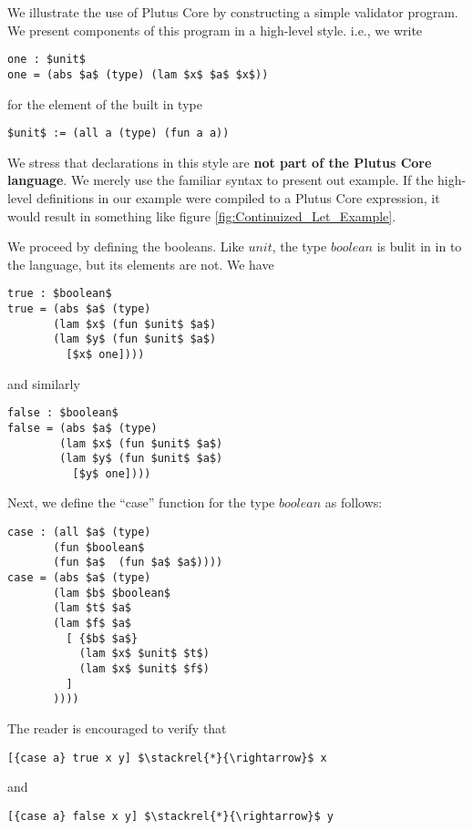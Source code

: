 \documentclass[../main.tex]{subfiles}
\begin{document}
We illustrate the use of Plutus Core by constructing a simple validator program. We present components of this program in a high-level style. i.e., we write
\begin{lstlisting}[basicstyle=\ttfamily,mathescape]
one : $unit$
one = (abs $a$ (type) (lam $x$ $a$ $x$))
\end{lstlisting}
for the element of the built in type
\begin{lstlisting}[basicstyle=\ttfamily,mathescape]
$unit$ := (all a (type) (fun a a))
\end{lstlisting}
We stress that declarations in this style are \textbf{not part of the Plutus Core language}. We merely use the familiar syntax to present out example. If the high-level definitions in our example were compiled to a Plutus Core expression, it would result in something like figure \ref{fig:Continuized_Let_Example}.

We proceed by defining the booleans. Like $unit$, the type $boolean$ is bulit in in to the language, but its elements are not. We have
\begin{lstlisting}[basicstyle=\ttfamily,mathescape]
true : $boolean$
true = (abs $a$ (type)
       (lam $x$ (fun $unit$ $a$)
       (lam $y$ (fun $unit$ $a$)
         [$x$ one])))
\end{lstlisting}
and similarly
\begin{lstlisting}[basicstyle=\ttfamily,mathescape]
false : $boolean$
false = (abs $a$ (type) 
        (lam $x$ (fun $unit$ $a$)
        (lam $y$ (fun $unit$ $a$)
          [$y$ one])))
\end{lstlisting}

Next, we define the ``case'' function for the type $boolean$ as follows:
\begin{lstlisting}[basicstyle=\ttfamily,mathescape]
case : (all $a$ (type)
       (fun $boolean$
       (fun $a$  (fun $a$ $a$))))
case = (abs $a$ (type)
       (lam $b$ $boolean$
       (lam $t$ $a$
       (lam $f$ $a$ 
         [ {$b$ $a$} 
           (lam $x$ $unit$ $t$)
           (lam $x$ $unit$ $f$)
         ]
       ))))
\end{lstlisting}
The reader is encouraged to verify that
\begin{lstlisting}[basicstyle=\ttfamily,mathescape]
[{case a} true x y] $\stackrel{*}{\rightarrow}$ x
\end{lstlisting}  
and
\begin{lstlisting}[basicstyle=\ttfamily,mathescape]
[{case a} false x y] $\stackrel{*}{\rightarrow}$ y
\end{lstlisting}  
\end{document}
